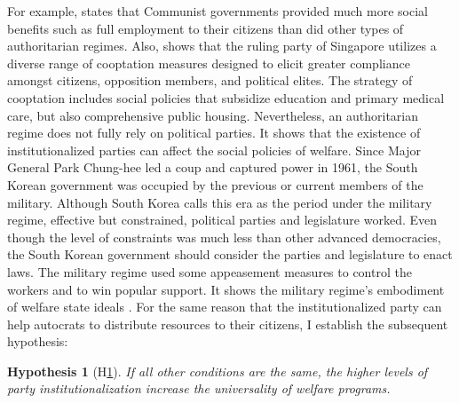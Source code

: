 \documentclass[11pt, notitlepage]{article}
\newtheorem{hyp}{Hypothesis}
\begin{document}
For example, \citet{Orenstein2008} states that Communist governments provided much more social benefits such as full employment to their citizens than did other types of authoritarian regimes. Also, \citet{Morgenbesser2017} shows that the ruling party of Singapore utilizes a diverse range of cooptation measures designed to elicit greater compliance amongst citizens, opposition members, and political elites. The strategy of cooptation includes social policies that subsidize education and primary medical care, but also comprehensive public housing. Nevertheless, an authoritarian regime does not fully rely on political parties. It shows that the existence of institutionalized parties can affect the social policies of welfare. Since Major General Park Chung-hee led a coup and captured power in 1961, the South Korean government was occupied by the previous or current members of the military. Although South Korea calls this era as the period under the military regime, effective but constrained, political parties and legislature worked. Even though the level of constraints was much less than other advanced democracies, the South Korean government should consider the parties and legislature to enact laws. The military regime used some appeasement measures to control the workers and to win popular support. It shows the military regime’s embodiment of welfare state ideals \citep[90-93]{Tang2000}. For the same reason that the institutionalized party can help autocrats to distribute resources to their citizens, I establish the subsequent hypothesis:\par

\begin{hyp}[H\ref{hyp:third}] \label{hyp:third}
	If all other conditions are the same, the higher levels of party institutionalization increase the universality of welfare programs.
\end{hyp}
\end{document}
